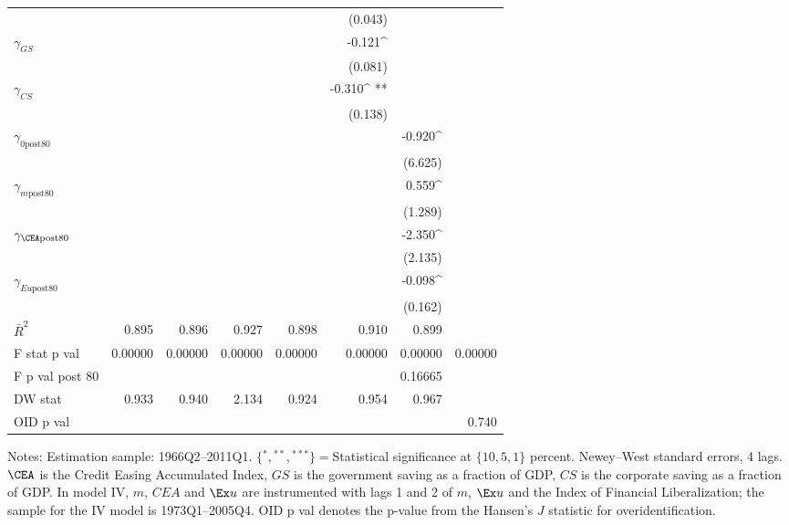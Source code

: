 \begin{table}
\begin{center}
\begin{tabular}{@{}ld{6}d{6}d{6}d{6}d{6}d{6}d{6}@{}}
 &   &  & & & (0.043)  & & \\
 $\gamma_{GS}$  &   & & & & -0.121^{ }  & & \\
 &   &  & & & (0.081)  &  & \\
 $\gamma_{CS}$  &   & & & &-0.310^{ **}  & & \\
 &   &  & & & (0.138)  & & \\
 $\gamma_{\text{0post80}}$  &   & & & & &-0.920^{ }  &  \\
 &   &  & & & & (6.625)   & \\
 $\gamma_{m\text{post80}}$  &   & & & & &0.559^{ }  &  \\
 &   &  & &  & &(1.289)  &  \\
 $\gamma_{\CEA\text{post80}}$  &   & & & & &-2.350^{ }  & \\
 &   &  & & & &(2.135)  & \\
 $\gamma_{Eu\text{post80}}$  &   & & & & &-0.098^{ }  &  \\
 &   &  & &  & & (0.162)  &  \\
\midrule 
 $\bar{R}^2$  & 0.895  & 0.896  & 0.927  & 0.898  & 0.910  & 0.899  & \\
 F stat p val  & 0.00000  & 0.00000  & 0.00000  & 0.00000  & 0.00000  & 0.00000  & 0.00000\\
 F p val post 80 &  & & & & & 0.16665  &  \\
DW stat  & 0.933  & 0.940  & 2.134  & 0.924  & 0.954  & 0.967 & \\
OID p val &  & & & &  & & 0.740\\
\bottomrule
\end{tabular}
\end{center}
 {\footnotesize Notes: Estimation sample: 1966Q2--2011Q1. $\{{}^*,{}^{**},{}^{***}\}={}$Statistical significance at $\{10,5,1\}$ percent. Newey--West standard errors, 4 lags. $\CEA$ is the Credit Easing Accumulated Index, $GS$ is the government saving as a fraction of GDP, $CS$ is the corporate saving as a fraction of GDP. In model IV, $m$, $CEA$ and $\Ex u$ are instrumented with lags 1 and 2 of $m$, $\Ex u$ and the \cite{abiadEtAl_FinReforms} Index of Financial Liberalization; the sample for the IV model is 1973Q1--2005Q4. OID p val denotes the p-value from the Hansen's $J$ statistic for overidentification.}
\end{table} 
